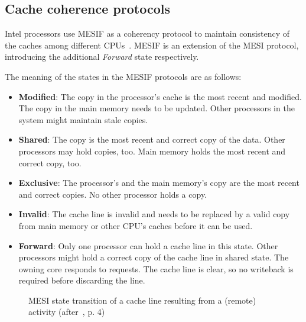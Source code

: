 \subsection{Cache coherence protocols}
\label{sec:state:technical:caches_protocol}
Intel processors
use MESIF as a coherency protocol to maintain consistency of the caches among
different CPUs~\cite{thomadakis2011architecture}.
MESIF is an extension of the MESI protocol, introducing the additional
\textit{Forward} state respectively.

The meaning of the states in the MESIF protocols are as follows:
\begin{itemize}
  \item \textbf{Modified}: The copy in the processor's cache is the most
    recent and modified. The copy in the main memory needs to be updated.
    Other processors in the system might maintain stale copies.
  \item \textbf{Shared}:  The copy is the most recent and correct copy of the
    data. Other processors may hold copies, too. Main memory holds the
    most recent and correct copy, too.
  \item \textbf{Exclusive}: The processor's and the main memory's copy are the
    most recent and correct copies. No other processor holds a copy.
  \item \textbf{Invalid}: The cache line is invalid and needs to be replaced by
    a valid copy from main memory or other CPU's caches before it can be used.
  \item \textbf{Forward}: Only one processor can hold a cache line in this
    state. Other processors might hold a correct copy of the cache line in
    shared state. The owning core responds to requests. The cache line is clear,
    so no writeback is required before discarding the line.
\end{itemize}

\begin{figure}
  \begin{center}
    
    \caption{MESI state transition of a cache line resulting from a (remote) activity (after~\cite{mckenney2010memory}, p. 4)}
    \label{fig:state:technical:mesi}
  \end{center}
\end{figure}


